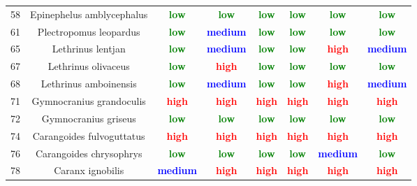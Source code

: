\documentclass{report}\usepackage[]{graphicx}\usepackage[]{color}
\begin{document}
\begin{table}[ht]
{\begin{tabular}{cccccccc}
   58 & Epinephelus amblycephalus & \textcolor{green}{\textbf{low}} & \textcolor{green}{\textbf{low}} & \textcolor{green}{\textbf{low}} & \textcolor{green}{\textbf{low}} & \textcolor{green}{\textbf{low}} & \textcolor{green}{\textbf{low}} \\ 
   61 & Plectropomus leopardus & \textcolor{green}{\textbf{low}} & \textcolor{blue}{\textbf{medium}} & \textcolor{green}{\textbf{low}} & \textcolor{green}{\textbf{low}} & \textcolor{green}{\textbf{low}} & \textcolor{green}{\textbf{low}} \\ 
   65 & Lethrinus lentjan & \textcolor{green}{\textbf{low}} & \textcolor{blue}{\textbf{medium}} & \textcolor{green}{\textbf{low}} & \textcolor{green}{\textbf{low}} & \textcolor{red}{\textbf{high}} & \textcolor{blue}{\textbf{medium}} \\ 
   67 & Lethrinus olivaceus & \textcolor{green}{\textbf{low}} & \textcolor{red}{\textbf{high}} & \textcolor{green}{\textbf{low}} & \textcolor{green}{\textbf{low}} & \textcolor{green}{\textbf{low}} & \textcolor{green}{\textbf{low}} \\ 
   68 & Lethrinus amboinensis & \textcolor{green}{\textbf{low}} & \textcolor{blue}{\textbf{medium}} & \textcolor{green}{\textbf{low}} & \textcolor{green}{\textbf{low}} & \textcolor{red}{\textbf{high}} & \textcolor{blue}{\textbf{medium}} \\ 
   71 & Gymnocranius grandoculis & \textcolor{red}{\textbf{high}} & \textcolor{red}{\textbf{high}} & \textcolor{red}{\textbf{high}} & \textcolor{red}{\textbf{high}} & \textcolor{red}{\textbf{high}} & \textcolor{red}{\textbf{high}} \\ 
   72 & Gymnocranius griseus & \textcolor{green}{\textbf{low}} & \textcolor{green}{\textbf{low}} & \textcolor{green}{\textbf{low}} & \textcolor{green}{\textbf{low}} & \textcolor{green}{\textbf{low}} & \textcolor{green}{\textbf{low}} \\ 
   74 & Carangoides fulvoguttatus & \textcolor{red}{\textbf{high}} & \textcolor{red}{\textbf{high}} & \textcolor{red}{\textbf{high}} & \textcolor{red}{\textbf{high}} & \textcolor{red}{\textbf{high}} & \textcolor{red}{\textbf{high}} \\ 
   76 & Carangoides chrysophrys & \textcolor{green}{\textbf{low}} & \textcolor{green}{\textbf{low}} & \textcolor{green}{\textbf{low}} & \textcolor{green}{\textbf{low}} & \textcolor{blue}{\textbf{medium}} & \textcolor{green}{\textbf{low}} \\ 
   78 & Caranx ignobilis & \textcolor{blue}{\textbf{medium}} & \textcolor{red}{\textbf{high}} & \textcolor{red}{\textbf{high}} & \textcolor{red}{\textbf{high}} & \textcolor{red}{\textbf{high}} & \textcolor{red}{\textbf{high}} \\ 

\end{tabular}}
\end{table}
\end{document}
